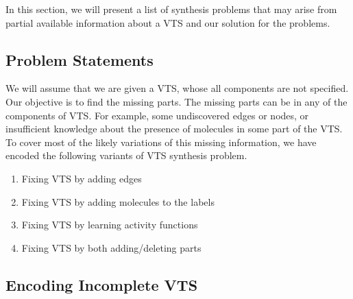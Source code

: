 %
In this section, we will present a list of synthesis problems that may
arise from partial available information about a VTS and our solution
for the problems.

\subsection{Problem Statements}

We will assume that we are given a VTS, whose all components
are not specified.
%
Our objective is to find the missing parts.
%
The missing parts can be in any of the components of VTS. 
%
For example, some undiscovered edges or nodes, or insufficient
knowledge about the presence of molecules in some part of the VTS.
%
To cover most of the likely variations of this missing information,
we have encoded the following variants of VTS synthesis problem.

\begin{enumerate}
\item Fixing VTS by adding edges 
\item Fixing VTS by adding molecules to the labels
\item Fixing VTS by learning activity functions
\item  Fixing VTS by both adding/deleting parts
\end{enumerate}


\subsection{Encoding Incomplete VTS}

